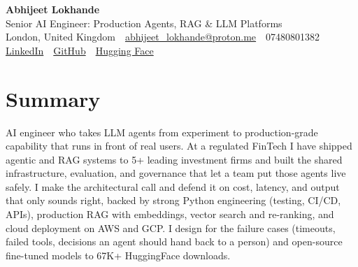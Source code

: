 \documentclass[10pt,a4paper]{article}
\newcommand{\sep}{\,\textcolor{accent!60}{\textbar}\,}
\begin{document}
\begin{center}
  {\fontsize{24}{26}\selectfont\bfseries Abhijeet Lokhande}\\[3pt]
  {\color{accent}\large Senior AI Engineer: Production Agents, RAG \& LLM Platforms}\\[5pt]
  {\small
    London, United Kingdom \sep
    \href{mailto:abhijeet_lokhande@proton.me}{abhijeet\_lokhande@proton.me} \sep
    07480801382 \\[2pt]
    \href{https://www.linkedin.com/in/ablds/}{LinkedIn} \sep
    \href{https://github.com/abhijeetscode}{GitHub} \sep
    \href{https://huggingface.co/ab-ai}{Hugging Face}
  }
\end{center}
\vspace{2pt}

\section{Summary}
AI engineer who takes LLM agents from experiment to production-grade capability that runs in front of real users. At a regulated FinTech I have shipped agentic and RAG systems to 5+ leading investment firms and built the shared infrastructure, evaluation, and governance that let a team put those agents live safely. I make the architectural call and defend it on cost, latency, and output that only sounds right, backed by strong Python engineering (testing, CI/CD, APIs), production RAG with embeddings, vector search and re-ranking, and cloud deployment on AWS and GCP. I design for the failure cases (timeouts, failed tools, decisions an agent should hand back to a person) and open-source fine-tuned models to 67K+ HuggingFace downloads.

\end{document}
